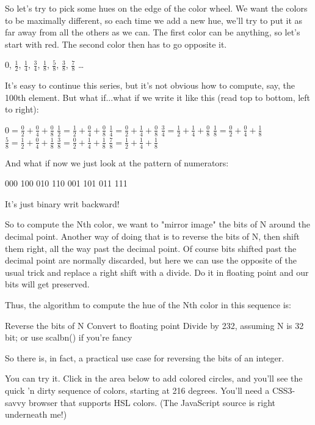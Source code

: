 So let's try to pick some hues on the edge of the color wheel. We want the colors to be maximally different, so each time we add a new hue, we'll try to put it as far away from all the others as we can. The first color can be anything, so let's start with red. The second color then has to go opposite it. 


    $ 0 $, $ \frac 1 2 $, $ \frac 1 4 $, $ \frac 3 4 $, $ \frac 1 8 $, $ \frac 5 8 $, $ \frac 3 8 $, $ \frac 7 8 $ …

    It's easy to continue this series, but it's not obvious how to compute, say, the 100th element. But what if...what if we write it like this (read top to bottom, left to right):

$ 0 = \frac 0 2 + \frac 0 4 + \frac 0 8 $
$ \frac 1 2 = \frac 1 2 + \frac 0 4 + \frac 0 8 $
$ \frac 1 4 = \frac 0 2 + \frac 1 4 + \frac 0 8 $
$ \frac 3 4 = \frac 1 2 + \frac 1 4 + \frac 0 8 $
$ \frac 1 8 = \frac 0 2 + \frac 0 4 + \frac 1 8 $
$ \frac 5 8 = \frac 1 2 + \frac 0 4 + \frac 1 8 $
$ \frac 3 8 = \frac 0 2 + \frac 1 4 + \frac 1 8 $
$ \frac 7 8 = \frac 1 2 + \frac 1 4 + \frac 1 8 $

And what if now we just look at the pattern of numerators:

000 100 010 110 001 101 011 111

It's just binary writ backward!

So to compute the Nth color, we want to "mirror image" the bits of N around the decimal point. Another way of doing that is to reverse the bits of N, then shift them right, all the way past the decimal point. Of course bits shifted past the decimal point are normally discarded, but here we can use the opposite of the usual trick and replace a right shift with a divide. Do it in floating point and our bits will get preserved.

Thus, the algorithm to compute the hue of the Nth color in this sequence is:

    Reverse the bits of N
    Convert to floating point
    Divide by 232, assuming N is 32 bit; or use scalbn() if you're fancy

So there is, in fact, a practical use case for reversing the bits of an integer.

You can try it. Click in the area below to add colored circles, and you'll see the quick 'n dirty sequence of colors, starting at 216 degrees. You'll need a CSS3-savvy browser that supports HSL colors. (The JavaScript source is right underneath me!) 